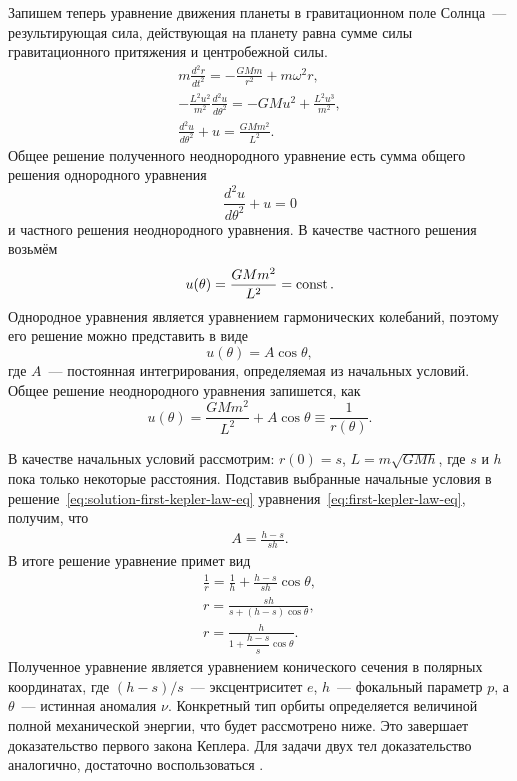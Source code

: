 Запишем теперь уравнение движения планеты в гравитационном поле Солнца~--- результирующая сила, действующая на планету равна сумме силы гравитационного притяжения и центробежной силы.
\begin{gather}
    m \frac{d^2 r}{d t^2} = - \frac{G M m}{r^2} + m \omega^2 r, \nonumber \\
    - \frac{L^2 u^2}{m^2} \frac{d^2 u}{d \theta^2} = - GMu^2 + \frac{L^2 u^3}{m^2}, \nonumber\\
    \frac{d^2 u}{d \theta^2} + u = \frac{GM m^2}{L^2}. \label{eq:first-kepler-law-eq}
\end{gather}
Общее решение полученного неоднородного уравнение есть сумма общего решения однородного уравнения
\begin{equation*}
    \frac{d^2 u}{d \theta^2} + u = 0
\end{equation*}
и частного решения неоднородного уравнения. В качестве частного решения возьмём
\begin{equation*}
    u(\theta) = \frac{GM m^2}{L^2} = \operatorname{const}.
\end{equation*}
Однородное уравнения является уравнением гармонических колебаний, поэтому его решение можно представить в виде
\begin{equation*}
    u(\theta) = A \cos \theta,
\end{equation*}
где $A$~--- постоянная интегрирования, определяемая из начальных условий. Общее решение неоднородного уравнения запишется, как
\begin{equation}
    u(\theta) = \frac{GM m^2}{L^2} + A \cos \theta \equiv \frac{1}{r(\theta)}.
    \label{eq:solution-first-kepler-law-eq}
\end{equation}

В качестве начальных условий рассмотрим: $r(0) = s$, $L = m\sqrt{G M h}$, где $s$ и $h$ пока только некоторые расстояния. Подставив выбранные начальные условия в решение~\eqref{eq:solution-first-kepler-law-eq} уравнения~\eqref{eq:first-kepler-law-eq}, получим, что
\begin{gather*}
    A = \frac{h - s}{sh}.
\end{gather*}
В итоге решение уравнение примет вид
\begin{gather}
    \frac{1}{r} = \frac{1}{h} + \frac{h - s}{sh} \cos \theta, \nonumber\\
    r = \frac{sh}{s + (h - s) \cos \theta}, \nonumber \\
    r = \frac{h}{1 + \dfrac{h - s}{s} \cos \theta}. 
    \label{eq:first-kepler-law-conic-seq-eq}
\end{gather}
Полученное уравнение является уравнением конического сечения в полярных координатах, где $(h - s)/s$~--- эксцентриситет $e$, $h$~--- фокальный параметр $p$, а $\theta$~--- истинная аномалия $\nu$. Конкретный тип орбиты определяется величиной полной механической энергии, что будет рассмотрено ниже. Это завершает доказательство первого закона Кеплера. Для задачи двух тел доказательство аналогично, достаточно воспользоваться .


